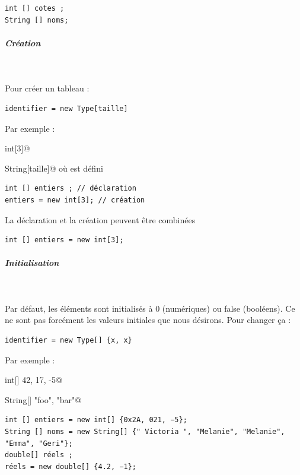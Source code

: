 \documentclass[11pt,a4paper]{article}
\begin{document}
            \par
        \begin{verbatim}
int [] cotes ;
String [] noms;
      \end{verbatim}
			
		\subparagraph{Cr\'eation} 
		
					\textcolor{white}{.} \par
				
        Pour cr\'eer un tableau : 
      
            \par
        \begin{verbatim}
identifier = new Type[taille]
      \end{verbatim}
        Par exemple :\par
				\verb@new int[3]@\par
				\verb@new String[taille]@ o\`u \verb@taille@ est d\'efini
      
            \par
        \begin{verbatim}
int [] entiers ; // déclaration
entiers = new int[3]; // création
      \end{verbatim}
        La d\'eclaration et la cr\'eation peuvent \^etre combin\'ees
      
            \par
        \begin{verbatim}
int [] entiers = new int[3];
      \end{verbatim}
			
		\subparagraph{Initialisation} 
		
					\textcolor{white}{.} \par
				
        Par d\'efaut, les \'el\'ements sont initialis\'es \`a 0 (num\'eriques) ou false (bool\'eens).
        Ce ne sont pas forc\'ement les valeurs initiales que nous d\'esirons. Pour changer \c ca :
      
            \par
        \begin{verbatim}
identifier = new Type[] {x, x}
      \end{verbatim}
        Par exemple :\par
				\verb@new int[] {42, 17, -5}@\par
				\verb@new String[] {"foo", "bar"}@
            \par
        \begin{verbatim}
int [] entiers = new int[] {0x2A, 021, −5};
String [] noms = new String[] {" Victoria ", "Melanie", "Melanie", "Emma", "Geri"};
double[] réels ;
réels = new double[] {4.2, −1};
      \end{verbatim}
			
\end{document}
